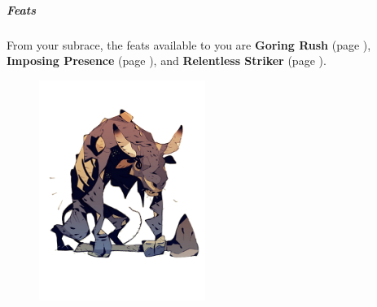    \subparagraph{Feats} From your subrace, the feats available to you are
    \textbf{Goring Rush} (page \pageref{feat::goringrush}),
    \textbf{Imposing Presence} (page \pageref{feat::imposingpresence}), and
    \textbf{Relentless Striker} (page \pageref{feat::relentlessstriker}).

\begin{figure}[!b]
    \centering
    \includegraphics[width=0.48\textwidth]{04kins/img/11gat_treb.png}
\end{figure}

\newpage
